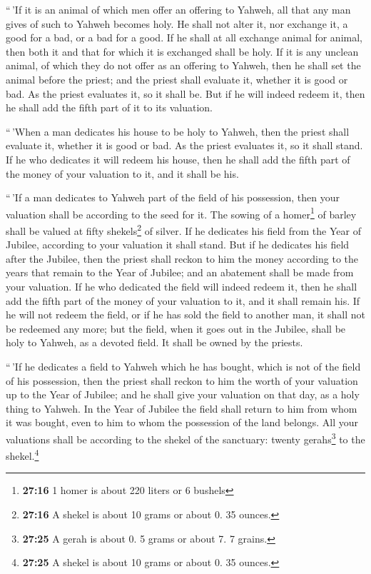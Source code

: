  ``\,'If it is an animal of which men offer an offering to
Yahweh, all that any man gives of such to Yahweh becomes holy.
 He shall not alter it, nor exchange it, a good for a
bad, or a bad for a good. If he shall at all exchange animal for animal,
then both it and that for which it is exchanged shall be holy.
 If it is any unclean animal, of which they do not offer
as an offering to Yahweh, then he shall set the animal before the
priest;  and the priest shall evaluate it, whether it is
good or bad. As the priest evaluates it, so it shall be. 
But if he will indeed redeem it, then he shall add the fifth part of it
to its valuation.

 ``\,'When a man dedicates his house to be holy to
Yahweh, then the priest shall evaluate it, whether it is good or bad. As
the priest evaluates it, so it shall stand.  If he who
dedicates it will redeem his house, then he shall add the fifth part of
the money of your valuation to it, and it shall be his.

 ``\,'If a man dedicates to Yahweh part of the field of
his possession, then your valuation shall be according to the seed for
it. The sowing of a homer\footnote{\textbf{27:16} 1 homer is about 220
  liters or 6 bushels} of barley shall be valued at fifty
shekels\footnote{\textbf{27:16} A shekel is about 10 grams or about 0.
  35 ounces.} of silver.  If he dedicates his field from
the Year of Jubilee, according to your valuation it shall stand.
 But if he dedicates his field after the Jubilee, then
the priest shall reckon to him the money according to the years that
remain to the Year of Jubilee; and an abatement shall be made from your
valuation.  If he who dedicated the field will indeed
redeem it, then he shall add the fifth part of the money of your
valuation to it, and it shall remain his.  If he will not
redeem the field, or if he has sold the field to another man, it shall
not be redeemed any more;  but the field, when it goes
out in the Jubilee, shall be holy to Yahweh, as a devoted field. It
shall be owned by the priests.

 ``\,'If he dedicates a field to Yahweh which he has
bought, which is not of the field of his possession, 
then the priest shall reckon to him the worth of your valuation up to
the Year of Jubilee; and he shall give your valuation on that day, as a
holy thing to Yahweh.  In the Year of Jubilee the field
shall return to him from whom it was bought, even to him to whom the
possession of the land belongs.  All your valuations
shall be according to the shekel of the sanctuary: twenty
gerahs\footnote{\textbf{27:25} A gerah is about 0. 5 grams or about 7. 7
  grains.} to the shekel.\footnote{\textbf{27:25} A shekel is about 10
  grams or about 0. 35 ounces.}

